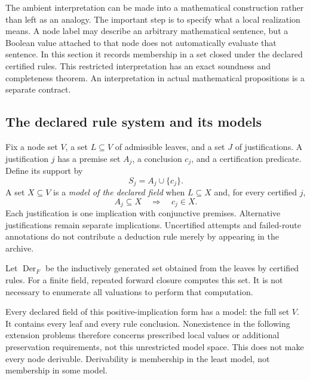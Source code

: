 The ambient interpretation can be made into a mathematical construction rather than left as an analogy. The important step is to specify what a local realization means. A node label may describe an arbitrary mathematical sentence, but a Boolean value attached to that node does not automatically evaluate that sentence. In this section it records membership in a set closed under the declared certified rules. This restricted interpretation has an exact soundness and completeness theorem. An interpretation in actual mathematical propositions is a separate contract.

\subsection{The declared rule system and its models}

Fix a node set $V$, a set $L\subseteq V$ of admissible leaves, and a set $J$ of justifications. A justification $j$ has a premise set $A_j$, a conclusion $c_j$, and a certification predicate. Define its support by
\[
S_j=A_j\cup\{c_j\}.
\]
A set $X\subseteq V$ is a \emph{model of the declared field} when $L\subseteq X$ and, for every certified $j$,
\[
A_j\subseteq X\quad\Longrightarrow\quad c_j\in X.
\]
Each justification is one implication with conjunctive premises. Alternative justifications remain separate implications. Uncertified attempts and failed-route annotations do not contribute a deduction rule merely by appearing in the archive.

Let $\operatorname{Der}_F$ be the inductively generated set obtained from the leaves by certified rules. For a finite field, repeated forward closure computes this set. It is not necessary to enumerate all valuations to perform that computation.

Every declared field of this positive-implication form has a model: the full set $V$. It contains every leaf and every rule conclusion. Nonexistence in the following extension problems therefore concerns prescribed local values or additional preservation requirements, not this unrestricted model space. This does not make every node derivable. Derivability is membership in the least model, not membership in some model.

